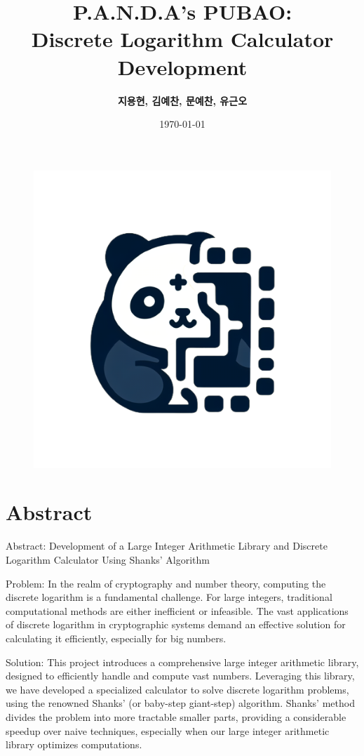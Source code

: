 \documentclass[12pt,a4paper]{article}
\title{P.A.N.D.A's PUBAO: \\Discrete Logarithm Calculator Development}
\author{\textcolor{lightblue!50!black}{\bf 지용현, 김예찬, 문예찬, 유근오}}
\date{\today}
\begin{document}
	
	\maketitle
	\thispagestyle{empty}  %
	\begin{figure}[h!]
		\centering
		\includegraphics[scale=.5]{panda4.png}
	\end{figure}
	\newpage  %
	
	\section*{Abstract}
	Abstract: Development of a Large Integer Arithmetic Library and Discrete Logarithm Calculator Using Shanks' Algorithm
	
	Problem: In the realm of cryptography and number theory, computing the discrete logarithm is a fundamental challenge. For large integers, traditional computational methods are either inefficient or infeasible. The vast applications of discrete logarithm in cryptographic systems demand an effective solution for calculating it efficiently, especially for big numbers.
	
	Solution: This project introduces a comprehensive large integer arithmetic library, designed to efficiently handle and compute vast numbers. Leveraging this library, we have developed a specialized calculator to solve discrete logarithm problems, using the renowned Shanks' (or baby-step giant-step) algorithm. Shanks' method divides the problem into more tractable smaller parts, providing a considerable speedup over naive techniques, especially when our large integer arithmetic library optimizes computations.
	
\end{document}
